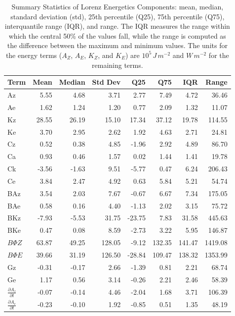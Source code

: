 \documentclass[pdflatex,sn-chicago]{sn-jnl}%
\theoremstyle{plain}
\theoremstyle{definition}
\theoremstyle{remark}
\theoremstyle{definition}
\begin{document}
\begin{table}[!htbp]
\centering
\caption[Summary Statistics of Lorenz Energetics Components]{Summary Statistics of Lorenz Energetics Components: mean, median, standard deviation (std), 25th percentile (Q25), 75th percentile (Q75), interquantile range (IQR), and range. The IQR measures the range within which the central 50\% of the values fall, while the range is computed as the difference between the maximum and minimum values. The units for the energy terms ($A_Z$, $A_E$, $K_Z$, and $K_E$) are $10^5 \, J \, m^{-2}$ and $W \, m^{-2}$ for the remaining terms.}
\label{tab:lec_stats}
\begin{tabular}{lrrrrrrr}
\toprule
Term & Mean & Median & Std Dev & Q25 & Q75 & IQR & Range \\
\midrule
Az & 5.55 & 4.68 & 3.71 & 2.77 & 7.49 & 4.72 & 36.46 \\
Ae & 1.62 & 1.24 & 1.20 & 0.77 & 2.09 & 1.32 & 11.07 \\
Kz & 28.55 & 26.19 & 15.10 & 17.34 & 37.12 & 19.78 & 114.55 \\
Ke & 3.70 & 2.95 & 2.62 & 1.92 & 4.63 & 2.71 & 24.81 \\
Cz & 0.52 & 0.38 & 4.85 & -1.96 & 2.92 & 4.89 & 86.70 \\
Ca & 0.93 & 0.46 & 1.57 & 0.02 & 1.44 & 1.41 & 19.78 \\
Ck & -3.56 & -1.63 & 9.51 & -5.77 & 0.47 & 6.24 & 206.43 \\
Ce & 3.84 & 2.47 & 4.92 & 0.63 & 5.84 & 5.21 & 54.74 \\
BAz & 3.54 & 2.03 & 7.67 & -0.67 & 6.67 & 7.34 & 175.05 \\
BAe & 0.58 & 0.16 & 4.40 & -1.13 & 2.02 & 3.15 & 75.72 \\
BKz & -7.93 & -5.53 & 31.75 & -23.75 & 7.83 & 31.58 & 445.63 \\
BKe & 0.47 & 0.08 & 8.59 & -2.73 & 3.22 & 5.95 & 146.87 \\
$B\Phi Z$ & 63.87 & 49.25 & 128.05 & -9.12 & 132.35 & 141.47 & 1419.08 \\
$B\Phi E$ & 39.66 & 31.19 & 126.50 & -28.84 & 109.47 & 138.32 & 1353.99 \\
Gz & -0.31 & -0.17 & 2.66 & -1.39 & 0.81 & 2.21 & 68.74 \\
Ge & 1.17 & 0.56 & 3.14 & -0.26 & 2.21 & 2.46 & 58.39 \\
$\frac{\partial A_z}{\partial t}$ & -0.07 & -0.14 & 4.46 & -2.04 & 1.68 & 3.71 & 106.39 \\
$\frac{\partial A_e}{\partial t}$ & -0.23 & -0.10 & 1.92 & -0.85 & 0.51 & 1.35 & 48.19 \\

\end{tabular}
\end{table}
\end{document}
